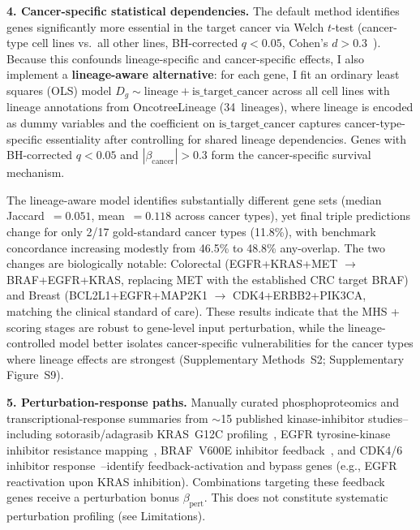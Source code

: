 \documentclass[times, twoside, watermark]{zHenriquesLab-StyleBioRxiv}
\begin{document}
\textbf{4. Cancer-specific statistical dependencies.} The default method identifies genes significantly more essential in the target cancer via Welch $t$-test (cancer-type cell lines vs.\ all other lines, BH-corrected $q < 0.05$, Cohen's $d > 0.3$~\cite{Benjamini1995,Cohen1988}). Because this confounds lineage-specific and cancer-specific effects, I also implement a \textbf{lineage-aware alternative}: for each gene, I fit an ordinary least squares (OLS) model $D_g \sim \text{lineage} + \text{is\_target\_cancer}$ across all cell lines with lineage annotations from OncotreeLineage (34~lineages), where lineage is encoded as dummy variables and the coefficient on $\text{is\_target\_cancer}$ captures cancer-type-specific essentiality after controlling for shared lineage dependencies. Genes with BH-corrected $q < 0.05$ and $|\beta_{\text{cancer}}| > 0.3$ form the cancer-specific survival mechanism.

The lineage-aware model identifies substantially different gene sets (median Jaccard~$= 0.051$, mean~$= 0.118$ across cancer types), yet final triple predictions change for only 2/17 gold-standard cancer types (11.8\%), with benchmark concordance increasing modestly from 46.5\% to 48.8\% any-overlap. The two changes are biologically notable: Colorectal (EGFR+KRAS+MET $\to$ BRAF+EGFR+KRAS, replacing MET with the established CRC target BRAF) and Breast (BCL2L1+EGFR+MAP2K1 $\to$ CDK4+ERBB2+PIK3CA, matching the clinical standard of care). These results indicate that the MHS + scoring stages are robust to gene-level input perturbation, while the lineage-controlled model better isolates cancer-specific vulnerabilities for the cancer types where lineage effects are strongest (Supplementary Methods~S2; Supplementary Figure~S9).

\textbf{5. Perturbation-response paths.} Manually curated phosphoproteomics and transcriptional-response summaries from $\sim$15 published kinase-inhibitor studies--including sotorasib/adagrasib KRAS~G12C profiling~\cite{Canon2019,Hallin2020}, EGFR tyrosine-kinase inhibitor resistance mapping~\cite{Bivona2011}, BRAF~V600E inhibitor feedback~\cite{Bollag2010,Lito2012}, and CDK4/6 inhibitor response~\cite{Finn2015}--identify feedback-activation and bypass genes (e.g., EGFR reactivation upon KRAS inhibition). Combinations targeting these feedback genes receive a perturbation bonus $\beta_{\text{pert}}$. This does not constitute systematic perturbation profiling (see Limitations).
\end{document}

